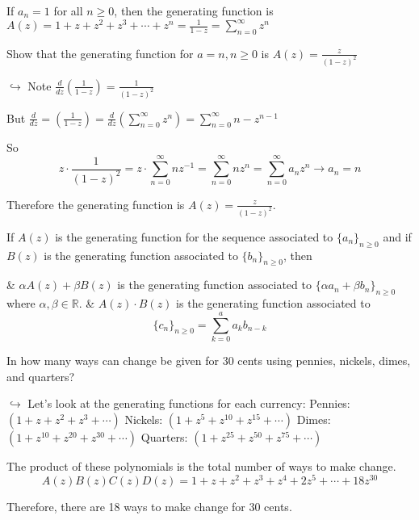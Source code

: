     \begin{ex}
        If $a_n = 1$ for all $n \ge 0$, then the generating function is $A(z) = 1 + z + z^2 + z^3 + \cdots + z^n = \frac{1}{1-z} = \sum^\infty_{n=0} z^n$
    \end{ex}

    \begin{ex}
        Show that the generating function for $a = n, n \ge 0$ is $A(z)=\frac{z}{ {(1 - z)}^2}$

        $\hookrightarrow$ Note $\frac{d}{dz} \left( \frac{1}{1-z} \right) = \frac{1}{ {(1 - z)}^2}$

        But $\frac{d}{dz} = \left( \frac{1}{1-z} \right) = \frac{d}{dz} \left( \sum^\infty_{n=0} z^n \right) = \sum^\infty_{n=0} n - z^{n - 1}$

        So
            \[
                z \cdot \frac{1}{ {(1 - z)}^2} = z \cdot \sum^\infty_{n=0} nz^{-1} = \sum^\infty_{n = 0} nz^n = \sum^\infty_{n=0} a_n z^n \to a_n = n
            \]

        Therefore the generating function is $A(z) = \frac{z}{ {(1 - z)}^2}$.
    \end{ex}

    \begin{thm}
        If $A(z)$ is the generating function for the sequence associated to $\{a_n\}_{n \ge 0}$ and if $B(z)$ is the generating function associated to $\{b_n\}_{n \ge 0}$, then
        \begin{easylist}[enumerate]
            & $\alpha A(z) + \beta B(z)$ is the generating function associated to $\{\alpha a_n + \beta b_n\}_{n \ge 0}$ where $\alpha, \beta \in \mathbb{R}$.
            & $A(z) \cdot B(z)$ is the generating function associated to
                \[ \{c_n\}_{n \ge 0} = \sum^a_{k=0} a_k b_{n-k} \]
        \end{easylist}
    \end{thm}

    \begin{ex}
        In how many ways can change be given for 30 cents using pennies, nickels, dimes, and quarters?

        $\hookrightarrow$ Let's look at the generating functions for each currency:
        Pennies: $(1 + z + z^2 + z^3 + \cdots)$
        Nickels: $(1 + z^5 + z^{10} + z^{15} + \cdots)$
        Dimes: $(1 + z^{10} + z^{20} + z^{30} + \cdots)$
        Quarters: $(1 + z^{25} + z^{50} + z^{75} + \cdots)$

        The product of these polynomials is the total number of ways to make change.
        \[ A(z)B(z)C(z)D(z) = 1 + z + z^2 + z^3 + z^4 + 2z^5 + \cdots + 18z^{30} \]

        Therefore, there are 18 ways to make change for 30 cents.
    \end{ex}

